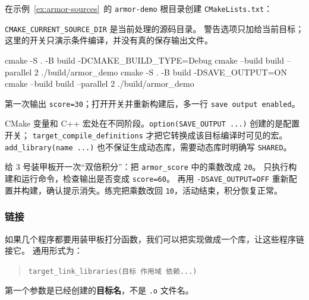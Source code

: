 \begin{example}[一次构建两个源文件]
在示例~\ref{ex:armor-sources}~的 \texttt{armor-demo} 根目录创建 \texttt{CMakeLists.txt}：


\texttt{CMAKE\_CURRENT\_SOURCE\_DIR} 是当前处理的源码目录。
警告选项只加给当前目标；这里的开关只演示条件编译，并没有真的保存输出文件。
\begin{tbash}
cmake -S . -B build -DCMAKE_BUILD_TYPE=Debug
cmake --build build --parallel 2
./build/armor_demo
cmake -S . -B build -DSAVE_OUTPUT=ON
cmake --build build --parallel 2
./build/armor_demo
\end{tbash}
第一次输出 \texttt{score=30}；打开开关并重新构建后，多一行 \texttt{save output enabled}。
\end{example}

\begin{note}
CMake 变量和 C++ 宏处在不同阶段。\texttt{option(SAVE\_OUTPUT ...)} 创建的是配置开关；
\texttt{target\_compile\_definitions} 才把它转换成该目标编译时可见的宏。
\texttt{add\_library(name ...)} 也不保证生成动态库，需要动态库时明确写 \texttt{SHARED}。
\end{note}

\begin{exercise}\label{ex:v1-build-incremental-switch}
给 3 号装甲板开一次“双倍积分”：把 \texttt{armor\_score} 中的乘数改成 \texttt{20}。
只执行构建和运行命令，检查输出是否变成 \texttt{score=60}。
再用 \texttt{-DSAVE\_OUTPUT=OFF} 重新配置并构建，确认提示消失。练完把乘数改回 \texttt{10}，活动结束，积分恢复正常。
\end{exercise}

\subsubsection{链接}
\label{sec:cmake-link}

如果几个程序都要用装甲板打分函数，我们可以把实现做成一个库，让这些程序链接它。
通用形式为：
\begin{quote}
\texttt{target\_link\_libraries(目标 作用域 依赖...)}
\end{quote}
第一个参数是已经创建的\textbf{目标名}，不是 \texttt{.o} 文件名。

